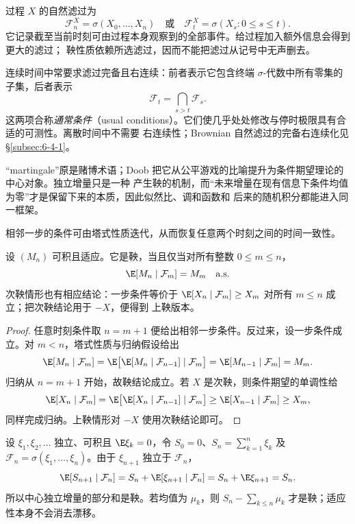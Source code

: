 \begin{definition}[自然滤过]\label{def:6-2-1-3}
过程 $X$ 的自然滤过为
\[
  \mathcal F_n^X=\sigma(X_0,\ldots,X_n)
  \quad\text{或}\quad
  \mathcal F_t^X=\sigma(X_s:0\le s\le t).
\]
它记录截至当前时刻可由过程本身观察到的全部事件。给过程加入额外信息会得到更大的滤过；
鞅性质依赖所选滤过，因而不能把滤过从记号中无声删去。
\end{definition}

\begin{remark}[连续时间滤过的通常条件]\label{remark:6-2-1-usual}
连续时间中常要求滤过完备且右连续：前者表示它包含终端 $\sigma$-代数中所有零集的子集，后者表示
\[
  \mathcal F_t=\bigcap_{s>t}\mathcal F_s.
\]
这两项合称\emph{通常条件}（usual conditions）。它们使几乎处处修改与停时极限具有合适的可测性。离散时间中不需要
右连续性；Brownian 自然滤过的完备右连续化见 \S\ref{subsec:6-4-1}。
\end{remark}

“martingale”原是赌博术语；Doob 把它从公平游戏的比喻提升为条件期望理论的中心对象。独立增量只是一种
产生鞅的机制，而“未来增量在现有信息下条件均值为零”才是保留下来的本质，因此似然比、调和函数和
后来的随机积分都能进入同一框架。

相邻一步的条件可由塔式性质迭代，从而恢复任意两个时刻之间的时间一致性。

\begin{proposition}[时间一致性]\label{proposition:6-2-1-1}
设 $(M_n)$ 可积且适应。它是鞅，当且仅当对所有整数 $0\le m\le n$，
\[
  \E[M_n\mid\mathcal F_m]=M_m\quad\text{a.s.}
\]
次鞅情形也有相应结论：一步条件等价于
$\E[X_n\mid\mathcal F_m]\ge X_m$ 对所有 $m\le n$ 成立；把次鞅结论用于 $-X$，便得到
上鞅版本。
\end{proposition}

\begin{proof}
任意时刻条件取 $n=m+1$ 便给出相邻一步条件。反过来，设一步条件成立。对 $m<n$，塔式性质与归纳假设给出
\[
 \E[M_n\mid\mathcal F_m]
 =\E\bigl[\E[M_n\mid\mathcal F_{n-1}]\mid\mathcal F_m\bigr]
 =\E[M_{n-1}\mid\mathcal F_m]=M_m.
\]
归纳从 $n=m+1$ 开始，故鞅结论成立。若 $X$ 是次鞅，则条件期望的单调性给
\[
 \E[X_n\mid\mathcal F_m]
 =\E\bigl[\E[X_n\mid\mathcal F_{n-1}]\mid\mathcal F_m\bigr]
 \ge \E[X_{n-1}\mid\mathcal F_m]\ge X_m,
\]
同样完成归纳。上鞅情形对 $-X$ 使用次鞅结论即可。
\end{proof}

\begin{example}[独立中心和]\label{ex:6-2-1-1}
设 $\xi_1,\xi_2,\ldots$ 独立、可积且 $\E\xi_k=0$，令
$S_0=0$、$S_n=\sum_{k=1}^n\xi_k$ 及
$\mathcal F_n=\sigma(\xi_1,\ldots,\xi_n)$。由于 $\xi_{n+1}$ 独立于
$\mathcal F_n$，
\[
 \E[S_{n+1}\mid\mathcal F_n]
 =S_n+\E[\xi_{n+1}\mid\mathcal F_n]
 =S_n+\E\xi_{n+1}=S_n.
\]
所以中心独立增量的部分和是鞅。若均值为 $\mu_k$，则
$S_n-\sum_{k\le n}\mu_k$ 才是鞅；适应性本身不会消去漂移。
\end{example}

